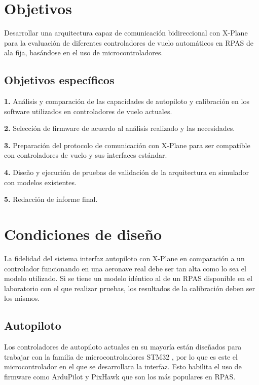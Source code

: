 \section{Objetivos}

Desarrollar una arquitectura capaz de comunicación bidireccional con X-Plane para la evaluación de diferentes controladores de vuelo automáticos en RPAS de ala fija, basándose en el uso de microcontroladores.

\subsection{Objetivos específicos}

\textbf{1.} Análisis y comparación de las capacidades de autopiloto y calibración en los software utilizados en controladores de vuelo actuales.

\textbf{2.} Selección de firmware de acuerdo al análisis realizado y las necesidades.

\textbf{3.} Preparación del protocolo de comunicación con X-Plane para ser compatible con controladores de vuelo y sus interfaces estándar.

\textbf{4.} Diseño y ejecución de pruebas de validación de la arquitectura en simulador con modelos existentes.

\textbf{5.} Redacción de informe final.

\section{Condiciones de diseño}

La fidelidad del sistema interfaz autopiloto con X-Plane en comparación a un controlador funcionando en una aeronave real debe ser tan alta como lo sea el modelo utilizado. Si se tiene un modelo idéntico al de un RPAS disponible en el laboratorio con el que realizar pruebas, los resultados de la calibración deben ser los mismos.

\subsection{Autopiloto}

Los controladores de autopiloto actuales en su mayoría están diseñados para trabajar con la familia de microcontroladores STM32 \cite{ardupilot-porting}, por lo que es este el microcontrolador en el que se desarrollara la interfaz. Esto habilita el uso de firmware como ArduPilot y PixHawk que son los más populares en RPAS.

